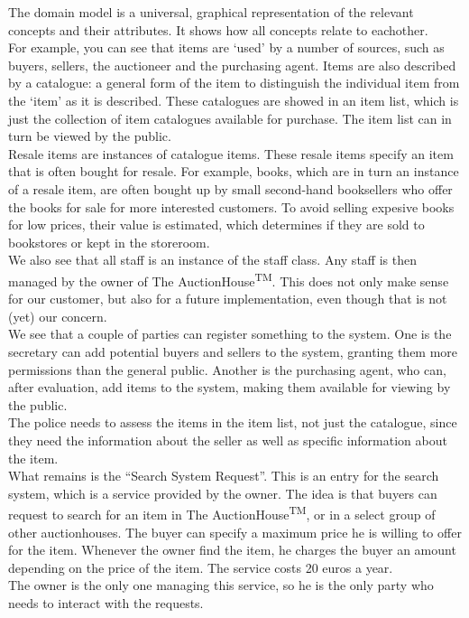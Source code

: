 
The domain model is a universal, graphical representation of the relevant concepts and their attributes. It shows how all concepts relate to eachother.\\
For example, you can see that items are `used' by a number of sources, such as buyers, sellers, the auctioneer and the purchasing agent. Items are also described by a catalogue: a general form of the item to distinguish the individual item from the `item' as it is described. These catalogues are showed in an item list, which is just the collection of item catalogues available for purchase. The item list can in turn be viewed by the public.\\
Resale items are instances of catalogue items. These resale items specify an item that is often bought for resale. For example, books, which are in turn an instance of a resale item, are often bought up by small second-hand booksellers who offer the books for sale for more interested customers. To avoid selling expesive books for low prices, their value is estimated, which determines if they are sold to bookstores or kept in the storeroom.\\
We also see that all staff is an instance of the staff class. Any staff is then managed by the owner of The AuctionHouse\textsuperscript{TM}. This does not only make sense for our customer, but also for a future implementation, even though that is not (yet) our concern.\\
We see that a couple of parties can register something to the system. One is the secretary can add potential buyers and sellers to the system, granting them more permissions than the general public. Another is the purchasing agent, who can, after evaluation, add items to the system, making them available for viewing by the public.\\
The police needs to assess the items in the item list, not just the catalogue, since they need the information about the seller as well as specific information about the item.\\
What remains is the ``Search System Request''. This is an entry for the search system, which is a service provided by the owner. The idea is that buyers can request to search for an item in The AuctionHouse\textsuperscript{TM}, or in a select group of other auctionhouses. The buyer can specify a maximum price he is willing to offer for the item. Whenever the owner find the item, he charges the buyer an amount depending on the price of the item. The service costs 20 euros a year.\\
The owner is the only one managing this service, so he is the only party who needs to interact with the requests.